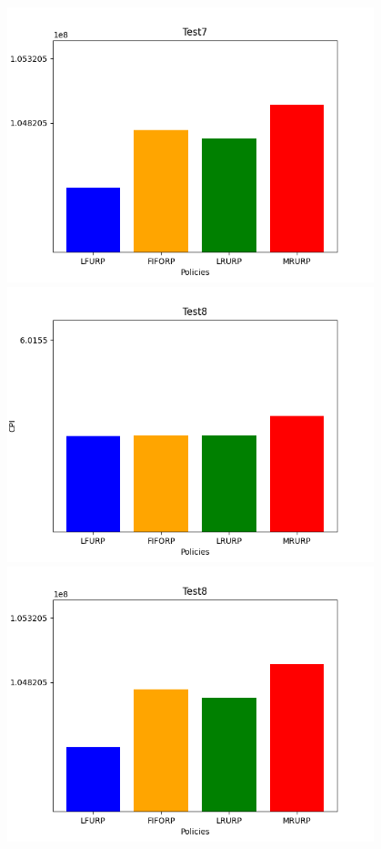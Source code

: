 ‫\includegraphics[width=0.8\textwidth]{graph/csv7Miss.png}\\
‫\includegraphics[width=0.8\textwidth]{graph/csv8CPI.png}\\
‫\includegraphics[width=0.8\textwidth]{graph/csv8Miss.png}\\
